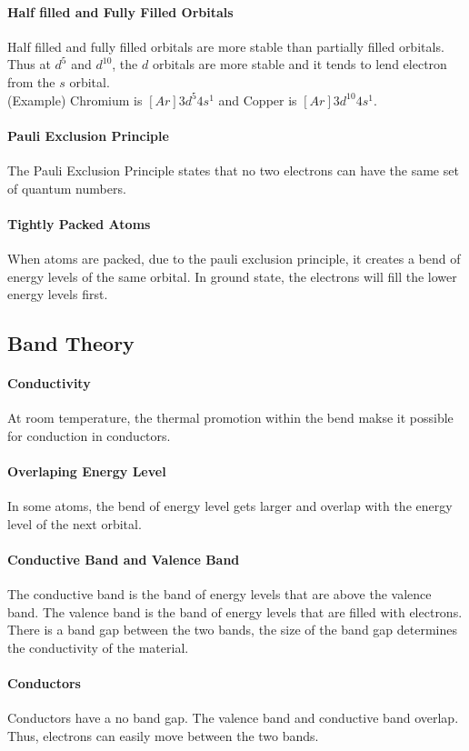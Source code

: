 \documentclass[11pt]{article}
\begin{document}
\paragraph{Half filled and Fully Filled Orbitals} Half filled and fully filled orbitals are more stable than partially filled orbitals. Thus at $d^5$ and $d^{10}$, the $d$ orbitals are more stable and it tends to lend electron from the $s$ orbital.\\
(Example) Chromium is $[Ar] 3d^5 4s^1$ and Copper is $[Ar] 3d^{10} 4s^1$.
\paragraph{Pauli Exclusion Principle} The Pauli Exclusion Principle states that no two electrons can have the same set of quantum numbers. 
\paragraph{Tightly Packed Atoms} When atoms are packed, due to the pauli exclusion principle, it creates a bend of energy levels of the same orbital. In ground state, the electrons will fill the lower energy levels first.
\subsection{Band Theory}
\paragraph{Conductivity} At room temperature, the thermal promotion within the bend makse it possible for conduction in conductors.
\paragraph{Overlaping Energy Level} In some atoms, the bend of energy level gets larger and overlap with the energy level of the next orbital. 
\paragraph{Conductive Band and Valence Band} The conductive band is the band of energy levels that are above the valence band. The valence band is the band of energy levels that are filled with electrons. There is a band gap between the two bands, the size of the band gap determines the conductivity of the material.
\paragraph{Conductors} Conductors have a no band gap. The valence band and conductive band overlap. Thus, electrons can easily move between the two bands.
\end{document}
